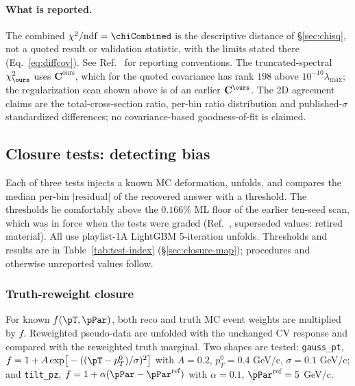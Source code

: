 \paragraph{What is reported.} The combined $\chi^{2}/\mathrm{ndf}=\chiCombined$ is the descriptive distance of \S\ref{sec:chisq}, not a quoted result or validation statistic, with the limits stated there (Eq.~\eqref{eq:diffcov}). See Ref.~\cite{NoteRecords2026} for reporting conventions. The truncated-spectral $\chi^{2}_{\ours}$ uses $\mathbf{C}^{\mathrm{ours}}$, which for the quoted covariance has rank $198$ above $10^{-10}\lambda_{\max}$; the regularization scan shown above is of an earlier $\mathbf{C}^{\ours}$. The 2D agreement claims are the total-cross-section ratio, per-bin ratio distribution and published-$\sigma$ standardized differences; no covariance-based goodness-of-fit is claimed. 

\subsection{Closure tests: detecting bias}
\label{sec:closure}

Each of three tests injects a known MC deformation, unfolds, and compares the median per-bin $|\text{residual}|$ of the recovered answer with a threshold. The thresholds lie comfortably above the $0.166\%$ ML floor of the earlier ten-seed scan, which was in force when the tests were graded (Ref.~\cite{NoteRecords2026}, superseded values: retired material). All use playlist-1A LightGBM 5-iteration unfolds. Thresholds and results are in Table~\ref{tab:test-index} (\S\ref{sec:closure-map}); procedures and otherwise unreported values follow.

\subsubsection{Truth-reweight closure}
\label{sec:closure-tr}
For known $f(\pT,\pPar)$, both reco and truth MC event weights are multiplied by $f$. Reweighted pseudo-data are unfolded with the unchanged CV response and compared with the reweighted truth marginal. Two shapes are tested: \texttt{gauss\_pt}, $f = 1 + A\exp\!\big[-((\pT - p_{T}^{0})/\sigma)^{2}\big]$ with $A=0.2$, $p_{T}^{0}=0.4$ GeV/c, $\sigma=0.1$ GeV/c; and \texttt{tilt\_pz}, $f = 1 + \alpha(\pPar - \pPar^{\text{ref}})$ with $\alpha=0.1$, $\pPar^{\text{ref}}=5$ GeV/c.

